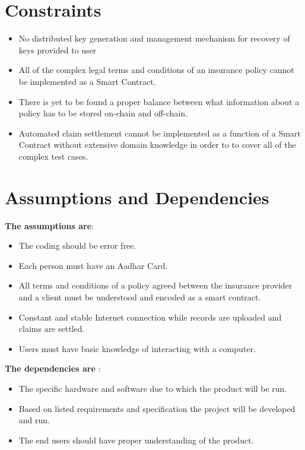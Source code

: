 \section{Constraints}
\begin{itemize}
	\item No distributed key generation and management mechanism for recovery of keys provided to user
	\item All of the complex legal terms and conditions of an insurance policy cannot be implemented as a Smart Contract.
	\item There is yet to be found a proper balance between what information about a policy has to be stored on-chain and off-chain.
	\item Automated claim settlement cannot be implemented as a function of a Smart Contract without extensive domain knowledge in order to to cover all of the complex test cases.
\end{itemize}



 


\section{Assumptions and Dependencies}
\textbf{The assumptions are}:
\begin{itemize}
	\item The coding should be error free.
	\item Each person must have an Aadhar Card.
	\item All terms and conditions of a policy agreed between the insurance provider and a client must be understood and encoded as a smart contract.
	\item Constant and stable Internet connection while records are uploaded and claims are settled.
	\item Users must have basic knowledge of interacting with a computer.
\end{itemize}
\textbf{The dependencies are }:
\begin{itemize}
	\item 	The specific hardware and software due to which the product will be run.
	\item   Based on listed requirements and specification the project will be developed and run.
	\item    The end users should have proper understanding of the product.
\end{itemize}
    
